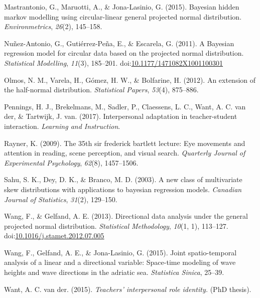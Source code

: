 \documentclass[11pt,]{article}
\begin{document}
\leavevmode\hypertarget{ref-mastrantonio2015bayesian}{}%
Mastrantonio, G., Maruotti, A., \& Jona-Lasinio, G. (2015). Bayesian
hidden markov modelling using circular-linear general projected normal
distribution. \emph{Environmetrics}, \emph{26}(2), 145--158.

\leavevmode\hypertarget{ref-nunez2011bayesian}{}%
Nuñez-Antonio, G., Gutiérrez-Peña, E., \& Escarela, G. (2011). A
Bayesian regression model for circular data based on the projected
normal distribution. \emph{Statistical Modelling}, \emph{11}(3),
185--201.
doi:\href{https://doi.org/10.1177/1471082X1001100301}{10.1177/1471082X1001100301}

\leavevmode\hypertarget{ref-olmos2012extension}{}%
Olmos, N. M., Varela, H., Gómez, H. W., \& Bolfarine, H. (2012). An
extension of the half-normal distribution. \emph{Statistical Papers},
\emph{53}(4), 875--886.

\leavevmode\hypertarget{ref-pennings2017interpersonal}{}%
Pennings, H. J., Brekelmans, M., Sadler, P., Claessens, L. C., Want, A.
C. van der, \& Tartwijk, J. van. (2017). Interpersonal adaptation in
teacher-student interaction. \emph{Learning and Instruction}.

\leavevmode\hypertarget{ref-rayner200935th}{}%
Rayner, K. (2009). The 35th sir frederick bartlett lecture: Eye
movements and attention in reading, scene perception, and visual search.
\emph{Quarterly Journal of Experimental Psychology}, \emph{62}(8),
1457--1506.

\leavevmode\hypertarget{ref-sahu2003new}{}%
Sahu, S. K., Dey, D. K., \& Branco, M. D. (2003). A new class of
multivariate skew distributions with applications to bayesian regression
models. \emph{Canadian Journal of Statistics}, \emph{31}(2), 129--150.

\leavevmode\hypertarget{ref-wang2012directional}{}%
Wang, F., \& Gelfand, A. E. (2013). Directional data analysis under the
general projected normal distribution. \emph{Statistical Methodology},
\emph{10}(1, 1), 113--127.
doi:\href{https://doi.org/10.1016/j.stamet.2012.07.005}{10.1016/j.stamet.2012.07.005}

\leavevmode\hypertarget{ref-wang2015joint}{}%
Wang, F., Gelfand, A. E., \& Jona-Lasinio, G. (2015). Joint
spatio-temporal analysis of a linear and a directional variable:
Space-time modeling of wave heights and wave directions in the adriatic
sea. \emph{Statistica Sinica}, 25--39.

\leavevmode\hypertarget{ref-vanderWant2015role}{}%
Want, A. C. van der. (2015). \emph{Teachers' interpersonal role
identity.} (PhD thesis).
\end{document}
